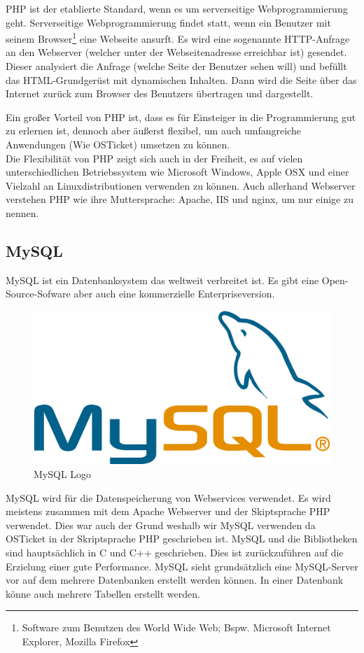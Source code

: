 	PHP ist der etablierte Standard, wenn es um serverseitige Webprogrammierung geht. Serverseitige Webprogrammierung findet statt, wenn ein Benutzer mit seinem Browser\footnote{Software zum Benutzen des World Wide Web; Bspw. Microsoft Internet Explorer, Mozilla Firefox} eine Webseite ansurft. Es wird eine sogenannte HTTP-Anfrage an den Webserver (welcher unter der Webseitenadresse erreichbar ist) gesendet. Dieser analysiert die Anfrage (welche Seite der Benutzer sehen will) und befüllt das HTML-Grundgerüst mit dynamischen Inhalten. Dann wird die Seite über das Internet zurück zum Browser des Benutzers übertragen und dargestellt.
	
	Ein großer Vorteil von PHP ist, dass es für Einsteiger in die Programmierung gut zu erlernen ist, dennoch aber äußerst flexibel, um auch umfangreiche Anwendungen (Wie OSTicket) umsetzen zu können. \\
	Die Flexibilität von PHP zeigt sich auch in der Freiheit, es auf vielen unterschiedlichen Betriebssystem wie Microsoft Windows, Apple OSX und einer Vielzahl an Linuxdistributionen verwenden zu können. Auch allerhand Webserver verstehen PHP wie ihre Muttersprache: Apache, IIS und nginx, um nur einige zu nennen.
	
	\subsection{MySQL}
	MySQL ist ein Datenbanksystem das weltweit verbreitet ist. Es gibt eine Open-Source-Sofware aber auch eine kommerzielle Enterpriseversion.
	
	\begin{figure}[h]
		\centering
		\includegraphics[scale=.35]{figures/mysql_logo.png}
		\caption{MySQL Logo}
		\label{MySQL_Logo}
	\end{figure}
	
	MySQL wird für die Datenspeicherung von Webservices verwendet. Es wird meistens zusammen mit dem Apache Webserver und der Skiptsprache PHP verwendet. Dies war auch der Grund weshalb wir MySQL verwenden da OSTicket in der Skriptsprache PHP geschrieben ist.
	MySQL und die Bibliotheken sind hauptsächlich in C und C++ geschrieben. Dies ist zurückzuführen auf die Erzielung einer gute Performance.
	MySQL sieht grundsätzlich eine MySQL-Server vor auf dem mehrere Datenbanken erstellt werden können. In einer Datenbank könne auch mehrere Tabellen erstellt werden.
	
